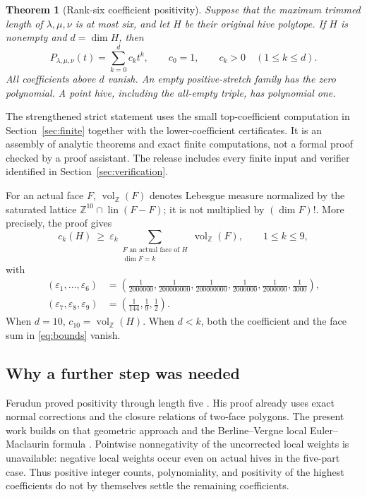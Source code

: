 \documentclass[11pt]{article}
\newtheorem{theorem}{Theorem}[section]
\theoremstyle{definition}\newtheorem{definition}[theorem]{Definition}
\theoremstyle{remark}\newtheorem{remark}[theorem]{Remark}
\newcommand{\Z}{\mathbb Z}\newcommand{\Q}{\mathbb Q}\newcommand{\R}{\mathbb R}
\newcommand{\vol}{\operatorname{vol}_{\Z}}
\newcommand{\eps}{\varepsilon}
\begin{document}
\begin{theorem}[Rank-six coefficient positivity]\label{thm:main}
Suppose that the maximum trimmed length of \(\lambda,\mu,\nu\) is at most
six, and let \(H\) be their original hive polytope. If \(H\) is nonempty
and \(d=\dim H\), then
\[
 P_{\lambda,\mu,\nu}(t)=\sum_{k=0}^{d}c_k t^k,
 \qquad c_0=1,\qquad c_k>0\quad(1\leq k\leq d).
\]
All coefficients above \(d\) vanish. An empty positive-stretch family has
the zero polynomial. A point hive, including the all-empty triple, has
polynomial one.
\end{theorem}

The strengthened strict statement uses the small top-coefficient computation
in Section~\ref{sec:finite} together with the lower-coefficient certificates.
It is an assembly of analytic theorems and exact finite computations, not a
formal proof checked by a proof assistant. The release includes every
finite input and verifier identified in Section~\ref{sec:verification}.

For an actual face \(F\), \(\vol(F)\) denotes Lebesgue measure normalized
by the saturated lattice \(\Z^{10}\cap\operatorname{lin}(F-F)\); it is not
multiplied by \((\dim F)!\). More precisely, the proof gives
\begin{equation}\label{eq:bounds}
 c_k(H)\ \geq\ \eps_k\sum_{\substack{F\text{ an actual face of }H\\\dim F=k}}
 \vol(F),\qquad 1\leq k\leq9,
\end{equation}
with
\[
\begin{aligned}
(\eps_1,\ldots,\eps_6)&=
\left(\frac1{2000000},\frac1{200000000},\frac1{200000000},
\frac1{2000000},\frac1{2000000},\frac1{3000}\right),\\
(\eps_7,\eps_8,\eps_9)&=
\left(\frac1{144},\frac1{9},\frac1{2}\right).
\end{aligned}
\]
When \(d=10\), \(c_{10}=\vol(H)\). When \(d<k\), both the coefficient
and the face sum in \eqref{eq:bounds} vanish.

\subsection{Why a further step was needed}
Ferudun proved positivity through length five \cite{ferudun}. His proof
already uses exact normal corrections and the closure relations of two-face
polygons. The present work builds on that geometric approach and the
Berline--Vergne local Euler--Maclaurin formula \cite{bv}.
Pointwise nonnegativity of the uncorrected local weights is unavailable:
negative local weights occur even on actual hives in the five-part case.
Thus positive integer counts, polynomiality, and positivity of the highest
coefficients do not by themselves settle the remaining coefficients.
\end{document}
